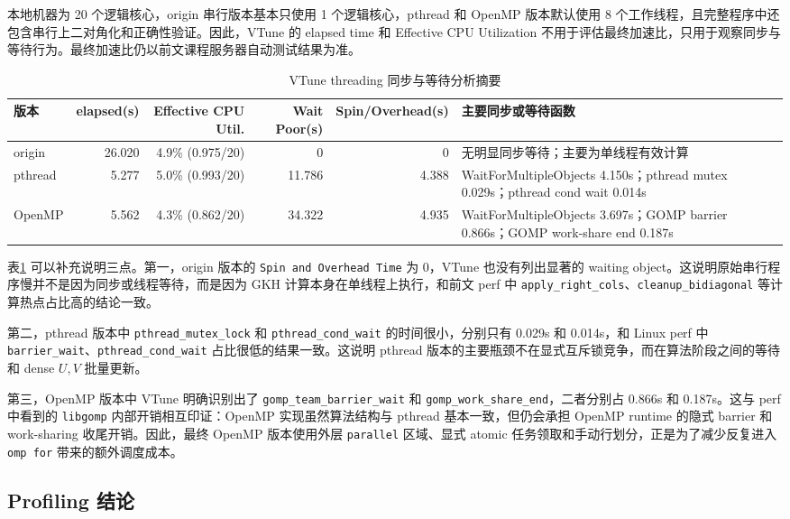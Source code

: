 ﻿\documentclass[UTF8,a4paper]{ctexart}
\begin{document}
本地机器为 20 个逻辑核心，origin 串行版本基本只使用 1 个逻辑核心，pthread 和 OpenMP 版本默认使用 8 个工作线程，且完整程序中还包含串行上二对角化和正确性验证。因此，VTune 的 elapsed time 和 Effective CPU Utilization 不用于评估最终加速比，只用于观察同步与等待行为。最终加速比仍以前文课程服务器自动测试结果为准。

\begin{table}[H]
\centering
\caption{VTune threading 同步与等待分析摘要}
\label{tab:vtune_threading}
\small
\begin{tabularx}{\textwidth}{lrrrrX}
\toprule
版本 & elapsed(s) & Effective CPU Util. & Wait Poor(s) & Spin/Overhead(s) & 主要同步或等待函数 \\
\midrule
origin & 26.020 & 4.9\% (0.975/20) & 0 & 0 &
无明显同步等待；主要为单线程有效计算 \\
pthread & 5.277 & 5.0\% (0.993/20) & 11.786 & 4.388 &
WaitForMultipleObjects 4.150s；pthread mutex 0.029s；pthread cond wait 0.014s \\
OpenMP & 5.562 & 4.3\% (0.862/20) & 34.322 & 4.935 &
WaitForMultipleObjects 3.697s；GOMP barrier 0.866s；GOMP work-share end 0.187s \\
\bottomrule
\end{tabularx}
\end{table}

表\ref{tab:vtune_threading} 可以补充说明三点。第一，origin 版本的 \texttt{Spin and Overhead Time} 为 0，VTune 也没有列出显著的 waiting object。这说明原始串行程序慢并不是因为同步或线程等待，而是因为 GKH 计算本身在单线程上执行，和前文 perf 中 \texttt{apply\_right\_cols}、\texttt{cleanup\_bidiagonal} 等计算热点占比高的结论一致。

第二，pthread 版本中 \texttt{pthread\_mutex\_lock} 和 \texttt{pthread\_cond\_wait} 的时间很小，分别只有 0.029s 和 0.014s，和 Linux perf 中 \texttt{barrier\_wait}、\texttt{pthread\_cond\_wait} 占比很低的结果一致。这说明 pthread 版本的主要瓶颈不在显式互斥锁竞争，而在算法阶段之间的等待和 dense $U,V$ 批量更新。

第三，OpenMP 版本中 VTune 明确识别出了 \texttt{gomp\_team\_barrier\_wait} 和 \texttt{gomp\_work\_share\_end}，二者分别占 0.866s 和 0.187s。这与 perf 中看到的 \texttt{libgomp} 内部开销相互印证：OpenMP 实现虽然算法结构与 pthread 基本一致，但仍会承担 OpenMP runtime 的隐式 barrier 和 work-sharing 收尾开销。因此，最终 OpenMP 版本使用外层 \texttt{parallel} 区域、显式 atomic 任务领取和手动行划分，正是为了减少反复进入 \texttt{omp for} 带来的额外调度成本。

\subsection{Profiling 结论}
\end{document}
